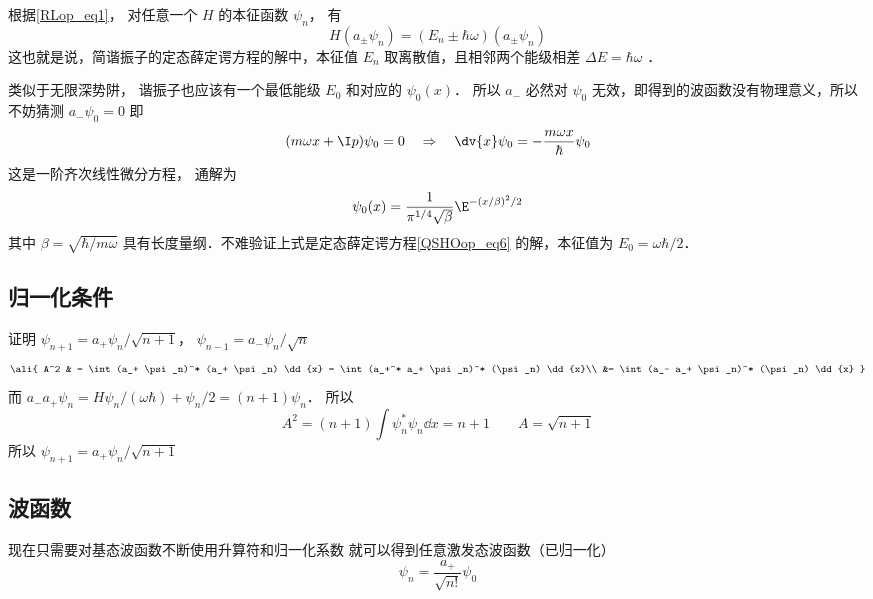 根据\autoref{RLop_eq1}， 对任意一个 $H$ 的本征函数 $\psi_n$， 有
\begin{equation}
H(a_\pm\psi_n) = (E_n\pm\hbar\omega) (a_ \pm \psi_n)
\end{equation}
这也就是说，简谐振子的定态薛定谔方程的解中，本征值 $E_n$ 取离散值，且相邻两个能级相差 $\Delta E = \hbar \omega$ ．

类似于无限深势阱， 谐振子也应该有一个最低能级 $E_0$ 和对应的 $\psi_0(x)$． 所以 $a_-$ 必然对 $\psi_0$ 无效，即得到的波函数没有物理意义，所以不妨猜测 $a_- \psi_0 = 0$ 
即
\begin{equation}
(m\omega x + \I p)\psi_0 = 0
\quad \Rightarrow \quad
\dv{x} \psi_0 =  - \frac{m\omega x}{\hbar } \psi_0
\end{equation}
这是一阶齐次线性微分方程，%
通解为
\begin{equation}
\psi_0(x) = \frac{1}{\pi^{1/4}\sqrt\beta} \E^{-(x/\beta)^2/2}
\end{equation}
其中 $\beta = \sqrt{\hbar /m\omega}$ 具有长度量纲．不难验证上式是定态薛定谔方程\autoref{QSHOop_eq6} 的解，本征值为 $E_0=\omega\hbar/2$．

\subsection{归一化条件}

证明 $\psi_{n+1} = a_+\psi_n/\sqrt{n+1}$，  $\psi_{n-1} = a_- \psi_n/\sqrt n$ 
\begin{equation}\ali{
A^2 & = \int (a_+ \psi_n)^* (a_+ \psi_n) \dd{x}
= \int (a_+^* a_+ \psi_n)^* (\psi_n) \dd{x}\\
&= \int (a_- a_+ \psi_n)^* (\psi_n) \dd{x}
}\end{equation}
而 $a_- a_+ \psi_n = H\psi_n/(\omega\hbar) + \psi_n/2 = (n + 1)\psi_n$． 所以
\begin{equation}
A^2 = (n + 1)\int \psi_n^*{\psi_n} \dd{x}  = n + 1\qquad
A = \sqrt{n+1}
\end{equation}
所以 $\psi_{n+1} = a_+ \psi_n/\sqrt{n+1}$

\subsection{波函数}
现在只需要对基态波函数不断使用升算符和归一化系数%
就可以得到任意激发态波函数（已归一化）
\begin{equation}
\psi_n = \frac{a_+}{\sqrt {n!}} \psi_0
\end{equation}

